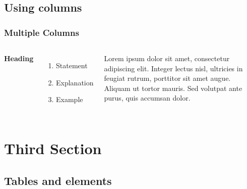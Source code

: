 \documentclass[aspectratio=169,xcolor=dvipsnames]{beamer}
\begin{document}

\subsection{Using columns}


\begin{frame}
    \frametitle{Multiple Columns}
    \begin{columns}[c] %

        \textbf{Heading}
        \begin{enumerate}
            \item Statement
            \item Explanation
            \item Example
        \end{enumerate}

        Lorem ipsum dolor sit amet, consectetur adipiscing elit. Integer lectus nisl, ultricies in feugiat rutrum, porttitor sit amet augue. Aliquam ut tortor mauris. Sed volutpat ante purus, quis accumsan dolor.

    \end{columns}
\end{frame}

\section{Third Section}

\subsection{Tables and elements}
\end{document}

